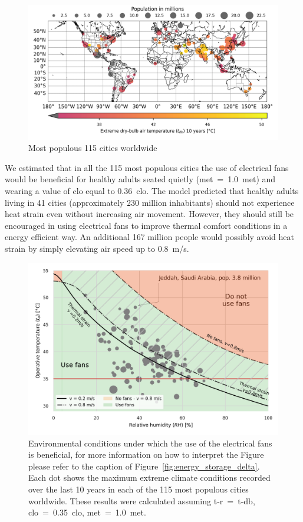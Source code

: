 \begin{figure}[thb!]
    \centering
    \includegraphics[width=\textwidth]{figures/map-population-temperature}
    \caption{Most populous 115 cities worldwide}
    \label{fig:map-population-temperature}
\end{figure}

We estimated that in all the 115 most populous cities the use of electrical fans would be beneficial for healthy adults seated quietly (\ac{met}~=~1.0~met) and wearing a value of \ac{clo} equal to 0.36~clo.
The  model predicted that healthy adults living in 41 cities (approximately 230 million inhabitants) should not experience heat strain even without increasing air movement.
However, they should still be encouraged in using electrical fans to improve thermal comfort conditions in a energy efficient way.
An additional 167 million people would possibly avoid heat strain by simply elevating air speed up to 0.8~m/s.

\begin{figure}[thb!]
    \centering
    \includegraphics[width=\textwidth]{figures/use_fans_and_population}
    \caption{Environmental conditions under which the use of the electrical fans is beneficial, for more information on how to interpret the Figure please refer to the caption of Figure~\ref{fig:energy_storage_delta}.
    Each dot shows the maximum extreme climate conditions recorded over the last 10 years in each of the 115 most populous cities worldwide.
     These results were calculated assuming \ac{t-r}~=~\ac{t-db}, \ac{clo}~=~0.35~clo, \ac{met}~=~1.0~met.}
    \label{fig:use_fans_and_population}
\end{figure}
